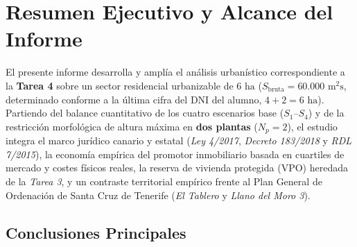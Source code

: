 \section*{Resumen Ejecutivo y Alcance del Informe}

El presente informe desarrolla y amplía el análisis urbanístico correspondiente a la \textbf{Tarea 4} sobre un sector residencial urbanizable de $6\text{ ha}$ ($S_{\text{bruta}} = 60.000\text{ m}^2\text{s}$, determinado conforme a la última cifra del DNI del alumno, $4 + 2 = 6\text{ ha}$). Partiendo del balance cuantitativo de los cuatro escenarios base ($S_1$--$S_4$) y de la restricción morfológica de altura máxima en \textbf{dos plantas} ($N_p = 2$), el estudio integra el marco jurídico canario y estatal (\emph{Ley 4/2017}, \emph{Decreto 183/2018} y \emph{RDL 7/2015}), la economía empírica del promotor inmobiliario basada en cuartiles de mercado y costes físicos reales, la reserva de vivienda protegida (VPO) heredada de la \emph{Tarea 3}, y un contraste territorial empírico frente al Plan General de Ordenación de Santa Cruz de Tenerife (\emph{El Tablero} y \emph{Llano del Moro 3}).

\subsection*{Conclusiones Principales}

